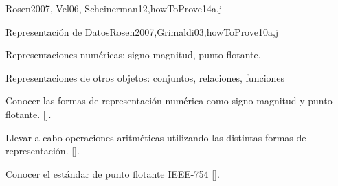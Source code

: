 \begin{syllabus}
\begin{unit}{\DSProofTechniques}{}{Rosen2007, Vel06, Scheinerman12,howToProve}{14}{a,j}
\begin{topics}
        \item \DSProofTechniquesTopicNotions%
        \item \DSProofTechniquesTopicThe%
        \item \DSProofTechniquesTopicDirect%
        \item \DSProofTechniquesTopicDisproving%
        \item \DSProofTechniquesTopicProof%
        \item \DSProofTechniquesTopicInduction%
        \item \DSProofTechniquesTopicStructural%
        \item \DSProofTechniquesTopicWeak%
        \item \DSProofTechniquesTopicRecursive%
        \item \DSProofTechniquesTopicWell%
\end{topics}

\begin{learningoutcomes}
	\item \DSProofTechniquesLOIdentifyTheUsed [\Assessment]
	\item \DSProofTechniquesLOOutline [\Usage ]
	\item \DSProofTechniquesLOApplyEach [\Usage ]
	\item \DSProofTechniquesLODetermineWhich [\Assessment]
	\item \DSProofTechniquesLOExplainTheIdeas [\Familiarity ]
	\item \DSProofTechniquesLOExplainTheWeak [\Assessment]
	\item \DSProofTechniquesLOStateThe [\Familiarity]
\end{learningoutcomes}
\end{unit}

\begin{unit}{Representación de Datos}{}{Rosen2007,Grimaldi03,howToProve}{10}{a,j}
\begin{topics}
    \item Representaciones numéricas: signo magnitud, punto flotante.
    \item Representaciones de otros objetos: conjuntos, relaciones, funciones
\end{topics}

\begin{learningoutcomes}
    \item Conocer las formas de representación numérica como signo magnitud y punto flotante. [\Assessment].
    \item Llevar a cabo operaciones aritméticas utilizando las distintas formas de representación. [\Assessment].
    \item Conocer el estándar de punto flotante IEEE-754 [\Familiarity].
\end{learningoutcomes}
 \end{unit}

\begin{coursebibliography}
\end{coursebibliography}

\end{syllabus}

%
